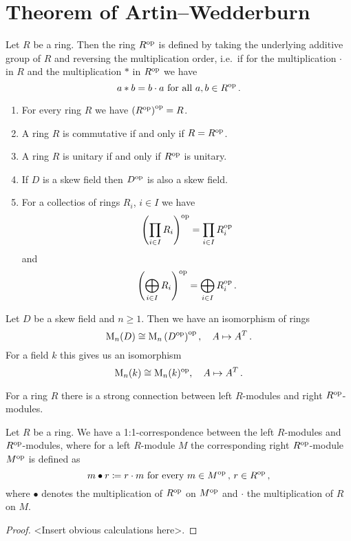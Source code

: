 \section{Theorem of Artin--Wedderburn}


\begin{definition}
  Let $R$ be a ring. Then the ring $R^{\mathrm{op}}$ is defined by taking the underlying additive group of $R$ and reversing the multiplication order, i.e.\ if for the multiplication $\cdot$ in $R$ and the multiplication $*$ in $R^{\mathrm{op}}$ we have
  \[
      a * b
    = b \cdot a
    \text{ for all }
    a, b \in R^{\mathrm{op}} \,.
  \]
\end{definition}


\begin{remark}
  \begin{enumerate}[label=\emph{\alph*)},leftmargin=*]
    \item
      For every ring $R$ we have $\left( R^{\mathrm{op}} \right)^{\mathrm{op}} = R$.
    \item
      A ring $R$ is commutative if and only if $R = R^{\mathrm{op}}$.
    \item
      A ring $R$ is unitary if and only if $R^{\mathrm{op}}$ is unitary.
    \item
      If $D$ is a skew field then $D^{\mathrm{op}}$ is also a skew field.
    \item
      For a collectios of rings $R_i$, $i \in I$ we have
      \[
          \left( \prod_{i \in I} R_i \right)^{\mathrm{op}}
        = \prod_{i \in I} R_i^{\mathrm{op}}
      \]
      and
      \[
          \left( \bigoplus_{i \in I} R_i \right)^{\mathrm{op}}
        = \bigoplus_{i \in I} R_i^{\mathrm{op}} \,.
      \]
  \end{enumerate}
\end{remark}


\begin{example}
  Let $D$ be a skew field and $n \geq 1$.
  Then we have an isomorphism of rings
  \[
            \operatorname{M}_n(D)
    \cong   \operatorname{M}_n\left( D^{\mathrm{op}} \right)^{\mathrm{op}},
    \quad   A
    \mapsto A^T \,.
  \]
  For a field $k$ this gives us an isomorphism
  \[
            \operatorname{M}_n(k)
    \cong   \operatorname{M}_n(k)^{\mathrm{op}},
    \quad   A
    \mapsto A^T \,.
  \]
\end{example}


For a ring $R$ there is a strong connection between left $R$-modules and right $R^{\mathrm{op}}$-modules.


\begin{proposition}\label{proposition: opposite modules}
  Let $R$ be a ring.
  We have a 1:1-correspondence between the left $R$-modules and $R^{\mathrm{op}}$-modules, where for a left $R$-module $M$ the corresponding right $R^{\mathrm{op}}$-module $M^{\mathrm{op}}$ is defined as
  \[
              m \bullet r
    \coloneqq r \cdot m
    \text{ for every }
    m \in M^{\mathrm{op}} \,,\,
    r \in R^{\mathrm{op}} \,,
  \]
  where $\bullet$ denotes the multiplication of $R^{\mathrm{op}}$ on $M^{\mathrm{op}}$ and $\cdot$ the multiplication of $R$ on $M$.
\end{proposition}
\begin{proof}
  <Insert obvious calculations here>.
\end{proof}


